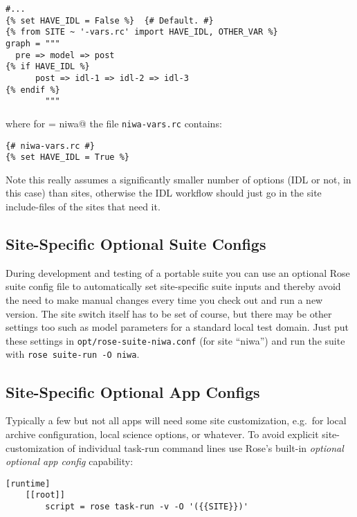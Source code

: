 \lstset{language=suiterc}
\begin{lstlisting}
#...
{% set HAVE_IDL = False %}  {# Default. #}
{% from SITE ~ '-vars.rc' import HAVE_IDL, OTHER_VAR %}
graph = """
  pre => model => post
{% if HAVE_IDL %}
      post => idl-1 => idl-2 => idl-3
{% endif %}
        """
\end{lstlisting}

where for \lstinline@SITE = niwa@ the file \lstinline=niwa-vars.rc= contains:
\lstset{language=suiterc}
\begin{lstlisting}
{# niwa-vars.rc #}
{% set HAVE_IDL = True %}
\end{lstlisting}

Note this really assumes a significantly smaller number of options (IDL or not,
in this case) than sites, otherwise the IDL workflow should just go in the site
include-files of the sites that need it.

\subsection{Site-Specific Optional Suite Configs}

During development and testing of a portable suite you can use an optional Rose
suite config file to automatically set site-specific suite inputs and thereby
avoid the need to make manual changes every time you check out and run a new
version. The site switch itself has to be set of course, but there may be other
settings too such as model parameters for a standard local test domain. Just
put these settings in \lstinline=opt/rose-suite-niwa.conf= (for site ``niwa'')
and run the suite with \lstinline=rose suite-run -O niwa=.

\subsection{Site-Specific Optional App Configs}

Typically a few but not all apps will need some site customization, e.g.\ for
local archive configuration, local science options, or whatever. To avoid
explicit site-customization of individual task-run command lines use Rose's
built-in {\em optional optional app config} capability:

\lstset{language=suiterc}
\begin{lstlisting}
[runtime]
    [[root]]
        script = rose task-run -v -O '({{SITE}})'
\end{lstlisting}

